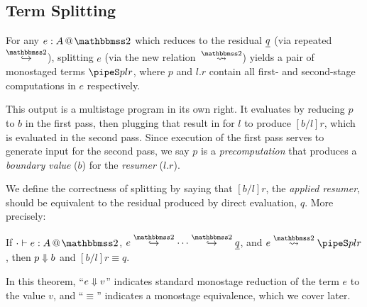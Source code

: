 \begin{abstrsyn}




\subsection{Term Splitting}

For any $\coltwo e A$
which reduces to the residual $\underline{q}$ (via repeated $\stepsym \bbtwo$),
splitting $e$ (via the new relation~$\splittwosym$)
yields a pair of monostaged terms $\pipeS p l r$, where $p$ and $l.r$
contain all first- and second-stage computations in $e$ respectively.

This output is a multistage program in its own right.
It evaluates by reducing $p$ to $b$ in the first pass,
then plugging that result in for $l$ to produce $[b/l]r$,
which is evaluated in the second pass.
Since execution of the first pass serves to generate input for
the second pass, we say $p$ is a {\em precomputation} that produces a
{\em boundary value} ($b$) for the {\em resumer} ($l.r$).

We define the correctness of splitting 
by saying that $[b/l]r$, the \emph{applied resumer}, should be equivalent 
to the residual produced by direct evaluation, $q$.
More precisely:
\begin{theorem}
\label{thm:allCorrect}
If $\typestwo [\cdot] e A$, $e \stepsym \bbtwo \cdots \stepsym \bbtwo \exv q$, and $\splittwo e A p l r$,
then ${p} \Downarrow {b}$ and $[b/l]r \equiv q$.
\end{theorem}
In this theorem, ``${e} \Downarrow {v}$'' indicates standard monostage reduction of the term $e$ to the value $v$,
and ``$\equiv$'' indicates a monostage equivalence, which we cover later.


\end{abstrsyn}
